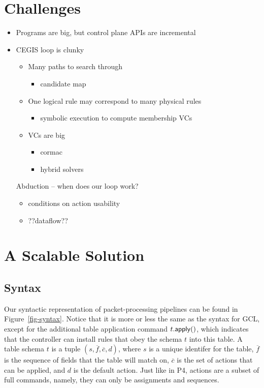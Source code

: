 \section{Challenges}
\begin{itemize}
\item Programs are big, but control plane APIs are incremental
\item CEGIS loop is clunky
  \begin{itemize}
  \item Many paths to search through
    \begin{itemize} \item candidate map \end{itemize}
  \item One logical rule may correspond to many physical rules
    \begin{itemize} \item symbolic execution to compute membership VCs \end{itemize}
  \item VCs are big
    \begin{itemize}
    \item cormac
    \item hybrid solvers
    \end{itemize}
  \end{itemize}
Abduction -- when does our loop work?
  \begin{itemize}
  \item conditions on action usability
  \item ??dataflow??
  \end{itemize}
\end{itemize}

\section{A Scalable Solution}

\subsection{Syntax}

Our syntactic representation of packet-processing pipelines can be
found in Figure~\ref{fig-syntax}. Notice that it is more or less the
same as the syntax for GCL, except for the additional table
application command $t.\mathsf{apply}()$, which indicates that the controller
can install rules that obey the schema $t$ into this table. A table
schema $t$ is a tuple $(s, \overline f, \overline c, d)$, where $s$ is
a unique identifer for the table, $\overline f$ is the sequence of
fields that the table will match on, $\overline c$ is the set of
actions that can be applied, and $d$ is the default action. Just like
in P4, actions are a subset of full commands, namely, they can only be
assignments and sequences.

